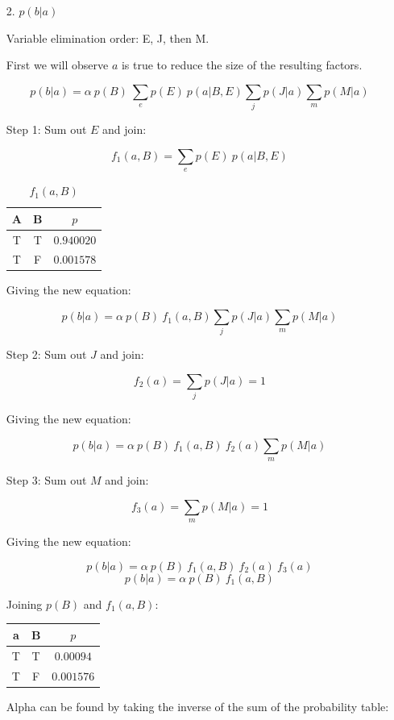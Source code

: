 \documentclass[fleqn]{hw}
\begin{document}
\begin{enumerate}
\item[2.] $p(b | a)$

Variable elimination order: E, J, then M. 

First we will observe $a$ is true to reduce the size of the resulting factors.

$$p(b | a) = \alpha \ p(B) \ \sum_{e} p(E) \ p(a | B, E) \sum_{j} p(J | a) \sum_{m} p(M | a)$$

Step 1: Sum out $E$ and join:

$$f_1(a, B) = \sum_{e} p(E) \ p(a | B, E)$$

\begin{table}[H]
\centering	
\begin{tabular}{|cc|c|}
\hline
{\bf A} & {\bf B} & $p$ \\
\hline
T & T & $0.940020$ \\
T & F & $0.001578$ \\
\hline
\end{tabular}
\caption{$f_1(a, B)$}
\end{table}

Giving the new equation:

$$p(b | a) = \alpha \ p(B) \ f_1(a, B) \sum_{j} p(J | a) \sum_{m} p(M | a)$$

Step 2: Sum out $J$ and join:

$$f_2(a) = \sum_{j} p(J | a) = 1$$

Giving the new equation:

$$p(b | a) = \alpha \ p(B) \ f_1(a, B) \ f_2(a) \sum_{m} p(M | a)$$

Step 3: Sum out $M$ and join:

$$f_3(a) = \sum_{m} p(M | a) = 1$$

Giving the new equation: 

$$p(b | a) = \alpha \ p(B) \ f_1(a, B) \ f_2(a) \ f_3(a)$$
$$p(b | a) = \alpha \ p(B) \ f_1(a, B)$$

Joining $p(B)$ and $f_1(a, B)$:

\begin{table}[H]
\centering	
\begin{tabular}{|cc|c|}
\hline
{\bf a} & {\bf B} & $p$ \\
\hline
T & T & $0.00094$ \\
T & F & $0.001576$ \\
\hline
\end{tabular}
\end{table}

Alpha can be found by taking the inverse of the sum of the probability table:


\end{enumerate}
\end{document}
